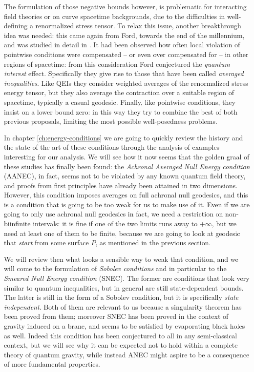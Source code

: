 The formulation of those negative bounds however, is problematic for interacting field theories or on curve spacetime backgrounds, due to the difficulties in well-defining a renormalized stress tensor. To relax this issue, another breakthrough idea was needed: this came again from Ford, towards the end of the millennium, and was studied in detail in \cite[]{ford1999quantum}. It had been observed how often local violation of pointwise conditions were compensated -- or even over compensated for -- in other regions of spacetime: from this consideration Ford conjectured the \emph{quantum interest} effect. Specifically they give rise to those that have been called \emph{averaged inequalities}. Like QEIs they consider weighted averages of the renormalized stress energy tensor, but they also average the contraction over a suitable region of spacetime, typically a casual geodesic. Finally, like pointwise conditions, they insist on a lower bound zero: in this way they try to combine the best of both previous proposals, limiting the most possible well-posedness problems.

In chapter \ref{ch:energy-conditions} we are going to quickly review the history and the state of the art of these conditions through the analysis of examples interesting for our analysis. We will see how it now seems that the golden graal of these studies has finally been found: the \emph{Achronal Averaged Null Energy condition} (AANEC), in fact, seems not to be violated by any known quantum field theory, and proofs from first principles have already been attained in two dimensions. However, this condition imposes averages on full achronal null geodesics, and this is a condition that is going to be too weak for us to make use of it.
Even if we are going to only use achronal null geodesics in fact, we need a restriction on non-biinfinite intervals: it is fine if one of the two limits runs away to \(+\infty\), but we need at least one of them to be finite, because we are going to look at geodesic that \emph{start} from some surface \(P\), as mentioned in the previous section.

We will review then what looks a sensible way to weak that condition, and we will come to the formulation of \emph{Sobolev conditions} and in particular to the \emph{Smeared Null Energy condition} (SNEC). The former are conditions that look very similar to quantum inequalities, but in general are still state-dependent bounds. The latter is still in the form of a Sobolev condition, but it is specifically \emph{state independent}. Both of them are relevant to us because a singularity theorem has been proved from them; moreover SNEC has been proved in the context of gravity induced on a brane, and seems to be satisfied by evaporating black holes as well. Indeed this condition has been conjectured to all in any semi-classical context, but we will see why it can be expected not to hold within a complete theory of quantum gravity, while instead ANEC might aspire to be a consequence of more fundamental properties.

